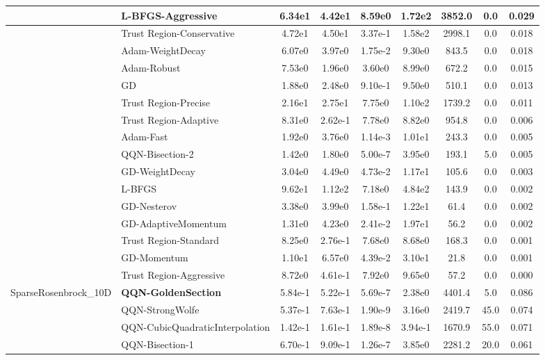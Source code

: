 \documentclass{article}
\begin{document}
\begin{longtable}{|l|l|c|c|c|c|c|c|c|}
\hline
 & L-BFGS-Aggressive & 6.34e1 & 4.42e1 & 8.59e0 & 1.72e2 & 3852.0 & 0.0 & 0.029 \\
\hline
 & Trust Region-Conservative & 4.72e1 & 4.50e1 & 3.37e-1 & 1.58e2 & 2998.1 & 0.0 & 0.018 \\
\hline
 & Adam-WeightDecay & 6.07e0 & 3.97e0 & 1.75e-2 & 9.30e0 & 843.5 & 0.0 & 0.018 \\
\hline
 & Adam-Robust & 7.53e0 & 1.96e0 & 3.60e0 & 8.99e0 & 672.2 & 0.0 & 0.015 \\
\hline
 & GD & 1.88e0 & 2.48e0 & 9.10e-1 & 9.50e0 & 510.1 & 0.0 & 0.013 \\
\hline
 & Trust Region-Precise & 2.16e1 & 2.75e1 & 7.75e0 & 1.10e2 & 1739.2 & 0.0 & 0.011 \\
\hline
 & Trust Region-Adaptive & 8.31e0 & 2.62e-1 & 7.78e0 & 8.82e0 & 954.8 & 0.0 & 0.006 \\
\hline
 & Adam-Fast & 1.92e0 & 3.76e0 & 1.14e-3 & 1.01e1 & 243.3 & 0.0 & 0.005 \\
\hline
 & QQN-Bisection-2 & 1.42e0 & 1.80e0 & 5.00e-7 & 3.95e0 & 193.1 & 5.0 & 0.005 \\
\hline
 & GD-WeightDecay & 3.04e0 & 4.49e0 & 4.73e-2 & 1.17e1 & 105.6 & 0.0 & 0.003 \\
\hline
 & L-BFGS & 9.62e1 & 1.12e2 & 7.18e0 & 4.84e2 & 143.9 & 0.0 & 0.002 \\
\hline
 & GD-Nesterov & 3.38e0 & 3.99e0 & 1.58e-1 & 1.22e1 & 61.4 & 0.0 & 0.002 \\
\hline
 & GD-AdaptiveMomentum & 1.31e0 & 4.23e0 & 2.41e-2 & 1.97e1 & 56.2 & 0.0 & 0.002 \\
\hline
 & Trust Region-Standard & 8.25e0 & 2.76e-1 & 7.68e0 & 8.68e0 & 168.3 & 0.0 & 0.001 \\
\hline
 & GD-Momentum & 1.10e1 & 6.57e0 & 4.39e-2 & 3.10e1 & 21.8 & 0.0 & 0.001 \\
\hline
 & Trust Region-Aggressive & 8.72e0 & 4.61e-1 & 7.92e0 & 9.65e0 & 57.2 & 0.0 & 0.000 \\
SparseRosenbrock\_10D & \textbf{QQN-GoldenSection} & 5.84e-1 & 5.22e-1 & 5.69e-7 & 2.38e0 & 4401.4 & 5.0 & 0.086 \\
\hline
 & QQN-StrongWolfe & 5.37e-1 & 7.63e-1 & 1.90e-9 & 3.16e0 & 2419.7 & 45.0 & 0.074 \\
\hline
 & QQN-CubicQuadraticInterpolation & 1.42e-1 & 1.61e-1 & 1.89e-8 & 3.94e-1 & 1670.9 & 55.0 & 0.071 \\
\hline
 & QQN-Bisection-1 & 6.70e-1 & 9.09e-1 & 1.26e-7 & 3.85e0 & 2281.2 & 20.0 & 0.061 \\

\end{longtable}
\end{document}
